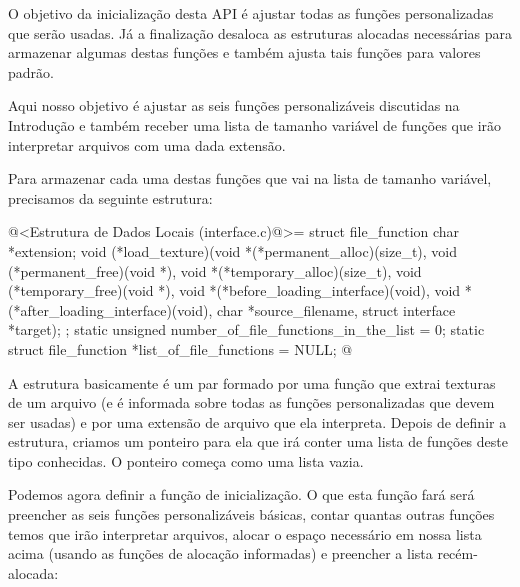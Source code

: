 
O objetivo da inicialização desta API é ajustar todas as funções
personalizadas que serão usadas. Já a finalização desaloca as
estruturas alocadas necessárias para armazenar algumas destas funções
e também ajusta tais funções para valores padrão.


Aqui nosso objetivo é ajustar as seis funções personalizáveis
discutidas na Introdução e também receber uma lista de tamanho
variável de funções que irão interpretar arquivos com uma dada
extensão.

Para armazenar cada uma destas funções que vai na lista de tamanho
variável, precisamos da seguinte estrutura:

\iniciocodigo
@<Estrutura de Dados Locais (interface.c)@>=
struct file_function {
  char *extension;
  void (*load_texture)(void *(*permanent_alloc)(size_t),
                      void (*permanent_free)(void *),
                      void *(*temporary_alloc)(size_t),
                      void (*temporary_free)(void *),
                      void *(*before_loading_interface)(void),
                      void *(*after_loading_interface)(void),
                      char *source_filename, struct interface *target);
};
static unsigned number_of_file_functions_in_the_list = 0;
static struct file_function *list_of_file_functions = NULL;
@
\fimcodigo

A estrutura basicamente é um par formado por uma função que extrai
texturas de um arquivo (e é informada sobre todas as funções
personalizadas que devem ser usadas) e por uma extensão de arquivo que
ela interpreta. Depois de definir a estrutura, criamos um ponteiro
para ela que irá conter uma lista de funções deste tipo conhecidas. O
ponteiro começa como uma lista vazia.

Podemos agora definir a função de inicialização. O que esta função
fará será preencher as seis funções personalizáveis básicas, contar
quantas outras funções temos que irão interpretar arquivos, alocar o
espaço necessário em nossa lista acima (usando as funções de alocação
informadas) e preencher a lista recém-alocada:

